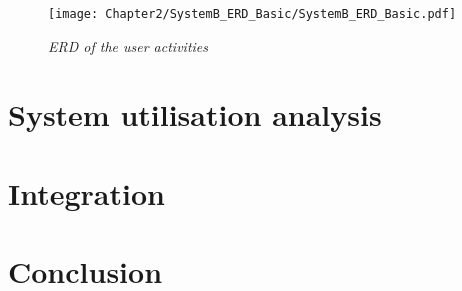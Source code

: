 \begin{figure}[!htb] %
	\centering %
	\texttt{[image: Chapter2/SystemB\_ERD\_Basic/SystemB\_ERD\_Basic.pdf]}
	\caption[ERD of user activities]
	{\textit{ERD of the user activities}}\label{fig:ch2:erdOfEventLogs}
\end{figure}

\clearpage

\section{System utilisation analysis}\label{ch2:system_utilisation_analysis}

\section{Integration}

\section{Conclusion}